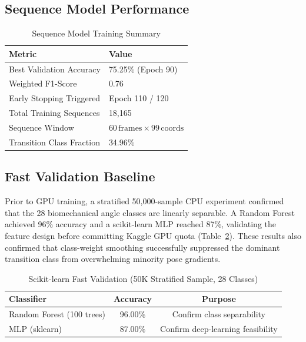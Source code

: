\documentclass[conference]{IEEEtran}
\begin{document}
\subsection{Sequence Model Performance}

\begin{table}[ht]
\centering
\caption{Sequence Model Training Summary}
\label{tab:seqresult}
\begin{tabular}{@{}ll@{}}
\toprule
\textbf{Metric} & \textbf{Value} \\
\midrule
Best Validation Accuracy & 75.25\% (Epoch 90) \\
Weighted F1-Score & 0.76 \\
Early Stopping Triggered & Epoch 110 / 120 \\
Total Training Sequences & 18,165 \\
Sequence Window & $60\,\text{frames} \times 99\,\text{coords}$ \\
Transition Class Fraction & 34.96\% \\
\bottomrule
\end{tabular}
\end{table}

\subsection{Fast Validation Baseline}

Prior to GPU training, a stratified 50,000-sample CPU experiment confirmed that
the 28 biomechanical angle classes are linearly separable. A Random Forest
achieved 96\% accuracy and a scikit-learn MLP reached 87\%, validating the
feature design before committing Kaggle GPU quota (Table~\ref{tab:sklearn}).
These results also confirmed that class-weight smoothing successfully suppressed
the dominant transition class from overwhelming minority pose gradients.

\begin{table}[!t]
\centering
\caption{Scikit-learn Fast Validation (50K Stratified Sample, 28 Classes)}
\label{tab:sklearn}
\begin{tabular}{@{}lcc@{}}
\toprule
\textbf{Classifier} & \textbf{Accuracy} & \textbf{Purpose} \\
\midrule
Random Forest (100 trees) & 96.00\% & Confirm class separability \\
MLP (sklearn) & 87.00\% & Confirm deep-learning feasibility \\
\bottomrule
\end{tabular}
\end{table}
\end{document}
